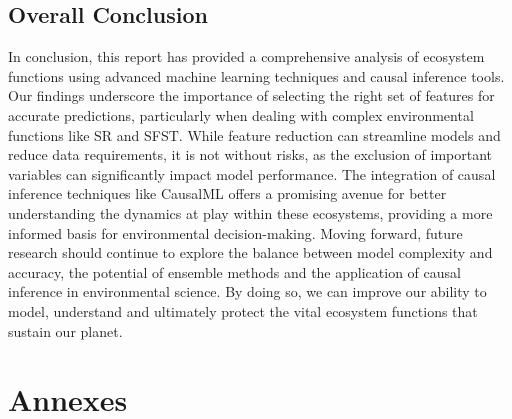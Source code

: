 \documentclass[12pt,letterpaper]{article}
\begin{document}
\subsection{Overall Conclusion}
In conclusion, this report has provided a comprehensive analysis of ecosystem functions using advanced machine learning techniques and causal inference tools.
Our findings underscore the importance of selecting the right set of features for accurate predictions, particularly when dealing with complex environmental functions like \ac{SR} and \ac{SFST}.
While feature reduction can streamline models and reduce data requirements, it is not without risks, as the exclusion of important variables can significantly impact model performance.
The integration of causal inference techniques like CausalML offers a promising avenue for better understanding the dynamics at play within these ecosystems, providing a more informed basis for environmental decision-making.
Moving forward, future research should continue to explore the balance between model complexity and accuracy, the potential of ensemble methods and the application of causal inference in environmental science.
By doing so, we can improve our ability to model, understand and ultimately protect the vital ecosystem functions that sustain our planet.













\clearpage
\section{Annexes}
\end{document}
